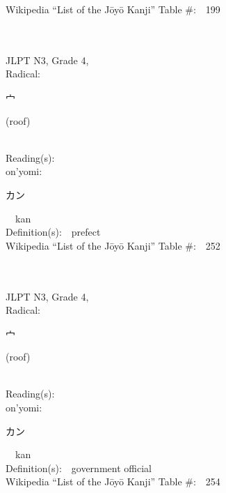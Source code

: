 \begin{multicols}{2}
Wikipedia ``List of the J\=oy\=o Kanji'' Table \#:\ \ 199 \\
\ \ \\
{\fontsize{34pt}{40pt}  }\ \ \\  %
{JLPT N3, Grade 4, \\Radical:\ \ {\begin{CJK}{UTF8}{min} 宀 \end{CJK}} (roof) } \\
Reading(s):\ \ \\
{\hspace*{1em}}on'yomi:\ \ \\
{\hspace*{2em}}{\begin{CJK}{UTF8}{min} カン \end{CJK}}\ \ kan\ \ \\
Definition(s):\ \ prefect \\
Wikipedia ``List of the J\=oy\=o Kanji'' Table \#:\ \ 252 \\
\ \ \\
{\fontsize{34pt}{40pt}  }\ \ \\  %
{JLPT N3, Grade 4, \\Radical:\ \ {\begin{CJK}{UTF8}{min} 宀 \end{CJK}} (roof) } \\
Reading(s):\ \ \\
{\hspace*{1em}}on'yomi:\ \ \\
{\hspace*{2em}}{\begin{CJK}{UTF8}{min} カン \end{CJK}}\ \ kan\ \ \\
Definition(s):\ \ government official \\
Wikipedia ``List of the J\=oy\=o Kanji'' Table \#:\ \ 254 \\
\ \ \\
{\fontsize{34pt}{40pt}  }\ \ \\  %

\end{multicols}
